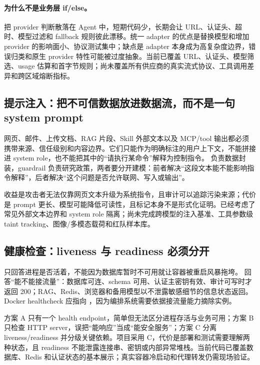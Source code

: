 \paragraph{为什么不是业务层 if/else。}
把 provider 判断散落在 Agent 中，短期代码少，长期会让 URL、认证头、超时、模型过滤和 fallback 规则彼此漂移。统一 adapter 的优点是替换模型和增加 provider 的影响面小、协议测试集中；缺点是 adapter 本身成为高复杂度边界，错误归类和原生 provider 特性可能被过度抽象。当前已覆盖 URL、认证头、模型筛选、usage 估算和首字节规则；尚未覆盖所有供应商的真实流式协议、工具调用差异和跨区域熔断指标。

\subsection{提示注入：把不可信数据放进数据流，而不是一句 system prompt}

网页、邮件、上传文档、RAG 片段、Skill 外部文本以及 MCP/tool 输出都必须携带来源、信任级别和内容边界。它们只能作为明确标注的用户上下文，不能拼接进 system role，也不能把其中的“请执行某命令”解释为控制指令。 负责数据封装，guardrail 负责研究政策，两者要分开建模：前者解决“这段文本能不能影响指令解释”，后者解决“这个问题是否允许联网、写入或输出”。

收益是攻击者无法仅靠网页文本升级为系统指令，且审计可以追踪污染来源；代价是 prompt 更长、模型可能降低可读性，且标记本身不是形式化证明。已经考虑了常见外部文本边界和 system role 隔离；尚未完成跨模型的注入基准、工具参数级 taint tracking、图像/多模态载荷和红队样本库。

\subsection{健康检查：liveness 与 readiness 必须分开}

 只回答进程是否活着，不能因为数据库暂时不可用就让容器被重启风暴拖垮。 回答“能不能接流量”：数据库可连、schema 可用、认证主密钥有效、审计可写时才返回 200；RAG、Redis、浏览器和备用模型以不泄露敏感细节的信息状态返回。Docker healthcheck 应指向 ，因为编排系统需要依据接流量能力摘除实例。

方案 A 只有一个 health endpoint，简单但无法区分进程存活与业务可用；方案 B 只检查 HTTP server，误把“能响应”当成“能安全服务”；方案 C 分离 liveness/readiness 并分级关键依赖。项目采用 C，代价是部署和测试需要理解两种状态，且 readiness 不能泄露连接串、密钥或内部异常堆栈。当前代码已覆盖数据库、Redis 和认证状态的基本展示；真实容器冷启动和代理转发仍需现场验证。

